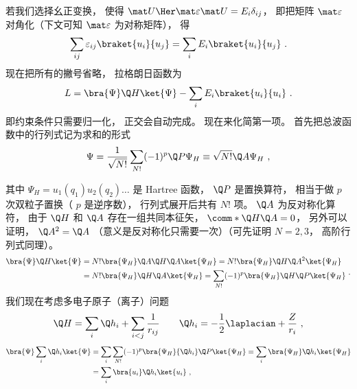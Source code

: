 若我们选择幺正变换， 使得 ${\mat U\Her }\mat \varepsilon \mat U = {E_i}{\delta_{ij}}$， %
即把矩阵 $\mat \varepsilon$ 对角化（下文可知 $\mat\varepsilon$ 为对称矩阵）， 得
\begin{equation}
\sum_{ij} \varepsilon_{ij} \braket{u_i}{u_j}
= \sum_i {E_i}  \braket{u_i}{u_j}~.
\end{equation}
现在把所有的撇号省略， 拉格朗日函数为
\begin{equation}
L =\bra{\Psi}\Q H \ket{\Psi}  - \sum_i E_i \braket{u_i}{u_i}~.
\end{equation}
即约束条件只需要归一化， 正交会自动完成。 现在来化简第一项。 首先把总波函数中的行列式记为求和的形式
\begin{equation}
\Psi  = \frac{1}{\sqrt {N!}} \sum_{N!} (-1)^p \Q P{\Psi_H}  \equiv \sqrt{N!} \Q A \Psi_H~,
\end{equation}

其中 $\Psi_H = u_1(q_1) u_2(q_2)\dots$ 是 Hartree 函数，  $\Q P$ 是置换算符， 相当于做 $p$ 次双粒子置换（ $p$ 是逆序数）， 行列式展开后共有 $N!$ 项。  $\Q A$ 为反对称化算符， 由于 $\Q H$ 和 $\Q A$ 存在一组共同本征矢， $\comm*{\Q H}{\Q A} = 0$，  另外可以证明， $\Q A^2 = \Q A$ （意义是反对称化只需要一次）（可先证明 $N = 2,3$，  高阶行列式同理）。
\begin{equation}
\begin{aligned}
\bra{\Psi}\Q H\ket{\Psi}  &= N!\bra{\Psi_H} \Q A\Q H\Q A \ket{\Psi_H} = N!\bra{\Psi_H}\Q H \Q A^2\ket{\Psi_H} \\
&= N!\bra{\Psi_H} \Q H\Q A\ket{\Psi_H}   = \sum_{N!} (-1)^p \bra{\Psi_H}\Q H\Q P\ket{\Psi_H}\\ 
\end{aligned}~.
\end{equation}
我们现在考虑多电子原子（离子）问题
\begin{equation}
\Q H = \sum_i \Q h_i + \sum_{i < j} \frac{1}{r_{ij}} \qquad
\Q h_i =  - \frac12 \laplacian + \frac{Z}{r_i}~,
\end{equation}
\begin{equation}
\begin{aligned}
\bra{\Psi}\sum_i \Q h_i \ket{\Psi} & = \sum_i \sum_{N!} ( - 1)^p \bra{\Psi_H}{\Q h_i}\Q P \ket{\Psi_H} = \sum_i \bra{\Psi_H} \Q h_i \ket{\Psi_H}\\
&= \sum_i \bra{u_i} \Q h_i \ket{u_i}~,
\end{aligned}
\end{equation}
 
